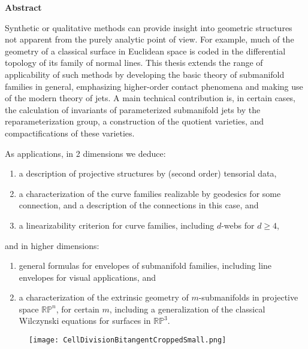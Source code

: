 \documentclass[12pt]{article}
\numberwithin{equation}{section}
\newcounter{count}
\theoremstyle{plain}
\theoremstyle{definition}
\newcommand{\RP}{\mathbb{RP}}
\begin{document}
\begin{center}\textbf{Abstract}\end{center}

Synthetic or qualitative methods can provide insight into geometric structures not apparent from the purely analytic point of view. For example, much of the geometry of a classical surface in Euclidean space is coded in the differential topology of its family of normal lines. This thesis extends the range of applicability of such methods by developing the basic theory of submanifold families in general, emphasizing higher-order contact phenomena and making use of the modern theory of jets. A main technical contribution is, in certain cases, the calculation of invariants of parameterized submanifold jets by the reparameterization group, a construction of the quotient varieties, and compactifications of these varieties.

As applications, in 2 dimensions we deduce:
\begin{enumerate}
\itemsep0em
\item{a description of projective structures by (second order) tensorial data,}
\item{a characterization of the curve families realizable by geodesics for some connection, and a description of the connections in this case, and}
\item{a linearizability criterion for curve families, including $d$-webs for $d\geq 4$,}
\end{enumerate}
and in higher dimensions:
\begin{enumerate}
\itemsep0em
\setcounter{enumi}{3}
\item{general formulas for envelopes of submanifold families, including line envelopes for visual applications, and}
\item{a characterization of the extrinsic geometry of $m$-submanifolds in projective space $\RP^{n}$, for certain $m$, including a generalization of the classical Wilczynski equations for surfaces in $\RP^{3}$.}
\end{enumerate}

\newpage
\vspace*{4\baselineskip}
\begin{figure}[H]
 \centering
   \texttt{[image: CellDivisionBitangentCroppedSmall.png]}
\end{figure}

\newpage

\listoffigures
\end{document}
